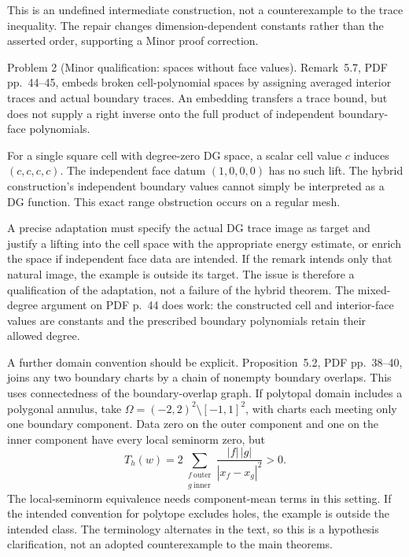 \documentclass[10pt]{article}
\begin{document}
This is an undefined intermediate construction, not a counterexample to the trace inequality. The repair changes dimension-dependent constants rather than the asserted order, supporting a Minor proof correction.\par
Problem 2 (Minor qualification: spaces without face values).  Remark 5.7, PDF pp. 44–45, embeds broken cell-polynomial spaces by assigning averaged interior traces and actual boundary traces. An embedding transfers a trace bound, but does not supply a right inverse onto the full product of independent boundary-face polynomials.\par
For a single square cell with degree-zero DG space, a scalar cell value \(c\) induces \((c,c,c,c)\). The independent face datum \((1,0,0,0)\) has no such lift. The hybrid construction’s independent boundary values cannot simply be interpreted as a DG function. This exact range obstruction occurs on a regular mesh.\par
A precise adaptation must specify the actual DG trace image as target and justify a lifting into the cell space with the appropriate energy estimate, or enrich the space if independent face data are intended. If the remark intends only that natural image, the example is outside its target. The issue is therefore a qualification of the adaptation, not a failure of the hybrid theorem. The mixed-degree argument on PDF p. 44 does work: the constructed cell and interior-face values are constants and the prescribed boundary polynomials retain their allowed degree.\par
A further domain convention should be explicit. Proposition 5.2, PDF pp. 38–40, joins any two boundary charts by a chain of nonempty boundary overlaps. This uses connectedness of the boundary-overlap graph. If polytopal domain includes a polygonal annulus, take \(\Omega=(-2,2)^2\setminus[-1,1]^2\), with charts each meeting only one boundary component. Data zero on the outer component and one on the inner component have every local seminorm zero, but \[T_h(w)=2\sum_{\substack{f\ \mathrm{outer}\\g\ \mathrm{inner}}}
              \frac{|f|\,|g|}{|x_f-x_g|^2}>0.\] The local-seminorm equivalence needs component-mean terms in this setting. If the intended convention for polytope excludes holes, the example is outside the intended class. The terminology alternates in the text, so this is a hypothesis clarification, not an adopted counterexample to the main theorems.\par
\end{document}
